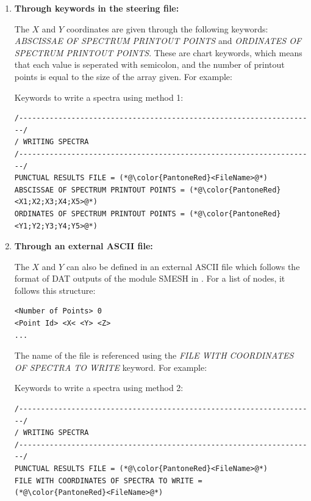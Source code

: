\begin{enumerate}

\item \textbf{Through keywords in the steering file:}

The $X$ and $Y$ coordinates are given through the following keywords:
\textit{ABSCISSAE OF SPECTRUM PRINTOUT POINTS} and \textit{ORDINATES OF SPECTRUM
  PRINTOUT POINTS}.
These are chart keywords, which means that each value is seperated with semicolon, and
the number of printout points is equal to the size of the array given. For example:

\begin{CommentBlock}{Keywords to write a spectra using method 1:}
\lstset{language=TelemacCas,
        basicstyle=\scriptsize\ttfamily}
\begin{lstlisting}[frame=trBL]
/--------------------------------------------------------------------/
/ WRITING SPECTRA
/--------------------------------------------------------------------/
PUNCTUAL RESULTS FILE = (*@\color{PantoneRed}<FileName>@*)
ABSCISSAE OF SPECTRUM PRINTOUT POINTS = (*@\color{PantoneRed}<X1;X2;X3;X4;X5>@*)
ORDINATES OF SPECTRUM PRINTOUT POINTS = (*@\color{PantoneRed}<Y1;Y2;Y3;Y4;Y5>@*)
\end{lstlisting}
\end{CommentBlock}

\item \textbf{Through an external ASCII file:}

  The $X$ and $Y$ can also be defined in an external ASCII file which follows the format
  of DAT outputs of the module {\scshape SMESH} in \salome{}. For a list of nodes, it
  follows this structure:

\lstset{language=TelemacCas,
        basicstyle=\scriptsize\ttfamily}
\begin{lstlisting}[frame=trBL]
<Number of Points> 0
<Point Id> <X< <Y> <Z>
...
\end{lstlisting}

The name of the file is referenced using the \textit{FILE WITH COORDINATES OF SPECTRA
  TO WRITE} keyword.
For example:

\begin{CommentBlock}{Keywords to write a spectra using method 2:}
\lstset{language=TelemacCas,
        basicstyle=\scriptsize\ttfamily}
\begin{lstlisting}[frame=trBL]
/--------------------------------------------------------------------/
/ WRITING SPECTRA
/--------------------------------------------------------------------/
PUNCTUAL RESULTS FILE = (*@\color{PantoneRed}<FileName>@*)
FILE WITH COORDINATES OF SPECTRA TO WRITE =
(*@\color{PantoneRed}<FileName>@*)
\end{lstlisting}
\end{CommentBlock}


\end{enumerate}

